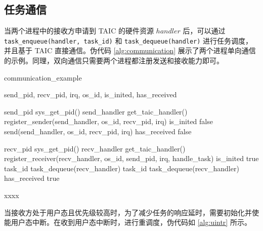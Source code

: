 \subsection{任务通信}

当两个进程中的接收方申请到 TAIC 的硬件资源 $handler$ 后，可以通过 \verb|task_enqueue(handler, task_id)| 和 \verb|task_dequeue(handler)| 进行任务调度，并且基于 TAIC 直接通信。伪代码 \ref{alg:communication} 展示了两个进程单向通信的示例。同理，双向通信只需要两个进程都注册发送和接收能力即可。

\begin{algorithm}[!ht]
  \caption{communication\_example}
  \label{alg:communication}
  \begin{algorithmic}[1]
    \State send\_pid, recv\_pid, irq, os\_id, is\_inited, has\_received

          
      \State send\_pid \gets sys\_get\_pid()
      \State send\_handler \gets get\_taic\_handler() 
      \State register\_sender(send\_handler, os\_id, recv\_pid, irq) 
      \Loop
        \EndWhile
        \State is\_inited \gets false
        \State send(send\_handler, os\_id, recv\_pid, irq) 
        \EndWhile
        \State has\_received \gets false
      \EndLoop
    \EndProcedure

          
      \State recv\_pid \gets sys\_get\_pid()
      \State recv\_handler \gets get\_taic\_handler() 
      \Loop
        \State register\_receiver(recv\_handler, os\_id, send\_pid, irq, handle\_task) 
        \State is\_inited \gets true
        \State task\_id \gets task\_dequeue(recv\_handler)
         
          \State task\_id \gets task\_dequeue(recv\_handler)
        \EndWhile
        \State has\_received \gets true
      \EndLoop
    \EndProcedure

          
      \State xxxx
    \EndProcedure
  \end{algorithmic}
\end{algorithm}

当接收方处于用户态且优先级较高时，为了减少任务的响应延时，需要初始化并使能用户态中断。在收到用户态中断时，进行重调度，伪代码如 \ref{alg:uintr} 所示。

